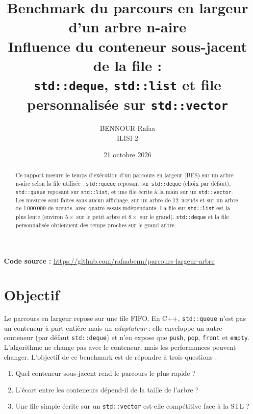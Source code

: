 \documentclass[11pt,a4paper]{article}
\title{\textbf{Benchmark du parcours en largeur d'un arbre n-aire}\\[4pt]
       \large Influence du conteneur sous-jacent de la file :\\
       \texttt{std::deque}, \texttt{std::list} et file personnalisée sur \texttt{std::vector}}
\author{BENNOUR Rafaa \\ ILISI 2}
\date{21 octobre 2026}
\begin{document}
\maketitle

\begin{abstract}
Ce rapport mesure le temps d'exécution d'un parcours en largeur (BFS) sur un arbre n-aire
selon la file utilisée : \texttt{std::queue} reposant sur \texttt{std::deque} (choix par défaut),
\texttt{std::queue} reposant sur \texttt{std::list}, et une file écrite à la main sur un
\texttt{std::vector}. Les mesures sont faites sans aucun affichage, sur un arbre de 12~nœuds
et sur un arbre de 1\,000\,000 de nœuds, avec quatre essais indépendants. La file sur
\texttt{std::list} est la plus lente (environ $5\times$ sur le petit arbre et $8\times$ sur le
grand). \texttt{std::deque} et la file personnalisée obtiennent des temps proches sur le grand arbre.
\end{abstract}

\noindent\textbf{Code source :} \url{https://github.com/rafaabenn/parcours-largeur-arbre}

\tableofcontents
\newpage

\section{Objectif}

Le parcours en largeur repose sur une file FIFO. En C++, \texttt{std::queue} n'est pas un
conteneur à part entière mais un \emph{adaptateur} : elle enveloppe un autre conteneur
(par défaut \texttt{std::deque}) et n'en expose que \texttt{push}, \texttt{pop}, \texttt{front}
et \texttt{empty}. L'algorithme ne change pas avec le conteneur, mais les performances peuvent
changer. L'objectif de ce benchmark est de répondre à trois questions :

\begin{enumerate}
  \item Quel conteneur sous-jacent rend le parcours le plus rapide ?
  \item L'écart entre les conteneurs dépend-il de la taille de l'arbre ?
  \item Une file simple écrite sur un \texttt{std::vector} est-elle compétitive face à la STL ?
\end{enumerate}

\end{document}
